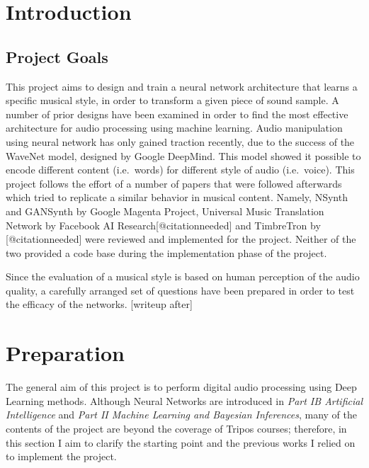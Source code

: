\documentclass[]{article}
\date{}
\begin{document}
\hypertarget{introduction}{%
\section{Introduction}\label{introduction}}

\hypertarget{project-goals}{%
\subsection{Project Goals}\label{project-goals}}

This project aims to design and train a neural network architecture that
learns a specific musical style, in order to transform a given piece of
sound sample. A number of prior designs have been examined in order to
find the most effective architecture for audio processing using machine
learning. Audio manipulation using neural network has only gained
traction recently, due to the success of the WaveNet model, designed by
Google DeepMind. This model showed it possible to encode different
content (i.e.~words) for different style of audio (i.e.~voice). This
project follows the effort of a number of papers that were followed
afterwards which tried to replicate a similar behavior in musical
content. Namely, NSynth and GANSynth by Google Magenta Project,
Universal Music Translation Network by Facebook AI
Research{[}@citationneeded{]} and TimbreTron by {[}@citationneeded{]}
were reviewed and implemented for the project. Neither of the two
provided a code base during the implementation phase of the project.

Since the evaluation of a musical style is based on human perception of
the audio quality, a carefully arranged set of questions have been
prepared in order to test the efficacy of the networks. {[}writeup
after{]}

\hypertarget{preparation}{%
\section{Preparation}\label{preparation}}

The general aim of this project is to perform digital audio processing
using Deep Learning methods. Although Neural Networks are introduced in
\emph{Part IB Artificial Intelligence} and \emph{Part II Machine
Learning and Bayesian Inferences}, many of the contents of the project
are beyond the coverage of Tripos courses; therefore, in this section I
aim to clarify the starting point and the previous works I relied on to
implement the project.
\end{document}
